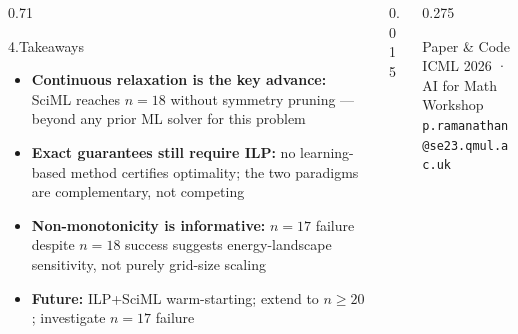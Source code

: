 \documentclass[final]{beamer}
\begin{document}
\begin{frame}[t]
\begin{columns}[t]
  \begin{column}{0.71\textwidth}
    \begin{block}{4.\enspace Takeaways}
      \begin{itemize}\setlength\itemsep{0.1em}
        \item \textbf{Continuous relaxation is the key advance:} SciML reaches $n=18$ without
          symmetry pruning — beyond any prior ML solver for this problem
        \item \textbf{Exact guarantees still require ILP:} no learning-based method certifies optimality;
          the two paradigms are complementary, not competing
        \item \textbf{Non-monotonicity is informative:} $n=17$ failure despite $n=18$ success
          suggests energy-landscape sensitivity, not purely grid-size scaling
        \item \textbf{Future:} ILP+SciML warm-starting; extend to $n\ge20$; investigate $n=17$ failure
      \end{itemize}
    \end{block}
  \end{column}
  \begin{column}{0.015\textwidth}\end{column}
  \begin{column}{0.275\textwidth}
    \begin{block}{Paper \& Code}
      \centering
      \vspace{0.2cm}
      \vspace{0.2cm}\\
      {\small ICML 2026 · AI for Math Workshop}\\[3pt]
      {\small \texttt{p.ramanathan@se23.qmul.ac.uk}}
    \end{block}
  \end{column}
\end{columns}

\vspace{0.15cm}

\end{frame}
\end{document}
